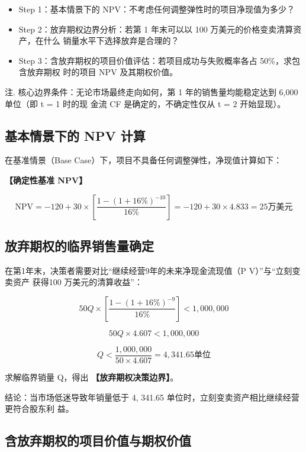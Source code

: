 \documentclass[lang=cn,10pt,color=blue]{elegantbook}
\begin{document}
\begin{itemize}
  \item Step 1：基本情景下的 NPV：不考虑任何调整弹性时的项目净现值为多少？

  \item Step 2：放弃期权边界分析：若第 1 年末可以以 100 万美元的价格变卖清算资产，在什么 销量水平下选择放弃是合理的？

  \item Step 3：含放弃期权的项目价值评估：若项目成功与失败概率各占 50\%，求包含放弃期权 时的项目 NPV 及其期权价值。
\end{itemize}

注. 核心边界条件：无论市场最终走向如何，第 1 年的销售量均能稳定达到 6,000 单位（即 t = 1 时的现 金流 CF 是确定的，不确定性仅从 t = 2 开始显现）。 

\subsection{基本情景下的 NPV 计算}

在基准情景（Base Case）下，项目不具备任何调整弹性，净现值计算如下： 

\textbf{\color{UnivColor} 【确定性基准 NPV】} 

$$
\mathrm{NPV} = - 120 + 30 \times \left[ \frac {1 - (1 + 16\%) ^ {- 10}}{16\%} \right] = - 120 + 30 \times 4.833 = 25 \text{万美元}
$$

\subsection{放弃期权的临界销售量确定}

在第1年末，决策者需要对比“继续经营9年的未来净现金流现值（P V）”与“立刻变卖资产 获得100 万美元的清算收益”： 

$$
50Q\times \left[\frac{1 - (1 + 16\%)^{-9}}{16\%}\right] <   1,000,000
$$

$$
5 0 Q \times 4. 6 0 7 <   1, 0 0 0, 0 0 0
$$

$$
Q <   \boxed {\frac {1 , 0 0 0 , 0 0 0}{5 0 \times 4 . 6 0 7} = 4, 3 4 1. 6 5 \text {单位}}
$$

求解临界销量 Q，得出\textbf{\color{UnivColor} 【放弃期权决策边界】}。 

结论：当市场低迷导致年销量低于 4, 341.65 单位时，立刻变卖资产相比继续经营更符合股东利 益。 

\subsection{含放弃期权的项目价值与期权价值}
\end{document}
